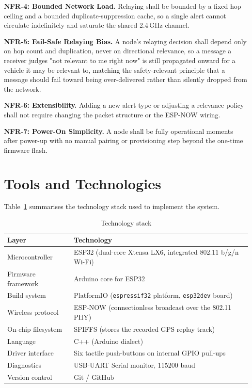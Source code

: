\documentclass[12pt,a4paper]{report}
\begin{document}
\textbf{NFR-4: Bounded Network Load.} Relaying shall be bounded by a fixed hop ceiling and a bounded duplicate-suppression cache, so a single alert cannot circulate indefinitely and saturate the shared 2.4\,GHz channel.

\textbf{NFR-5: Fail-Safe Relaying Bias.} A node's relaying decision shall depend only on hop count and duplication, never on directional relevance, so a message a receiver judges "not relevant to me right now" is still propagated onward for a vehicle it may be relevant to, matching the safety-relevant principle that a message should fail toward being over-delivered rather than silently dropped from the network.

\textbf{NFR-6: Extensibility.} Adding a new alert type or adjusting a relevance policy shall not require changing the packet structure or the ESP-NOW wiring.

\textbf{NFR-7: Power-On Simplicity.} A node shall be fully operational moments after power-up with no manual pairing or provisioning step beyond the one-time firmware flash.

\section{Tools and Technologies}
Table~\ref{tab:stack} summarises the technology stack used to implement the system.

\begin{table}[H]
\centering
\caption{Technology stack}
\label{tab:stack}
\begin{tabular}{@{}p{4.2cm}p{9.4cm}@{}}
\toprule
\textbf{Layer} & \textbf{Technology} \\
\midrule
Microcontroller & ESP32 (dual-core Xtensa LX6, integrated 802.11 b/g/n Wi-Fi) \\
Firmware framework & Arduino core for ESP32 \\
Build system & PlatformIO (\texttt{espressif32} platform, \texttt{esp32dev} board) \\
Wireless protocol & ESP-NOW (connectionless broadcast over the 802.11 PHY) \\
On-chip filesystem & SPIFFS (stores the recorded GPS replay track) \\
Language & C++ (Arduino dialect) \\
Driver interface & Six tactile push-buttons on internal GPIO pull-ups \\
Diagnostics & USB-UART Serial monitor, 115200 baud \\
Version control & Git / GitHub \\
\bottomrule
\end{tabular}
\end{table}
\end{document}
